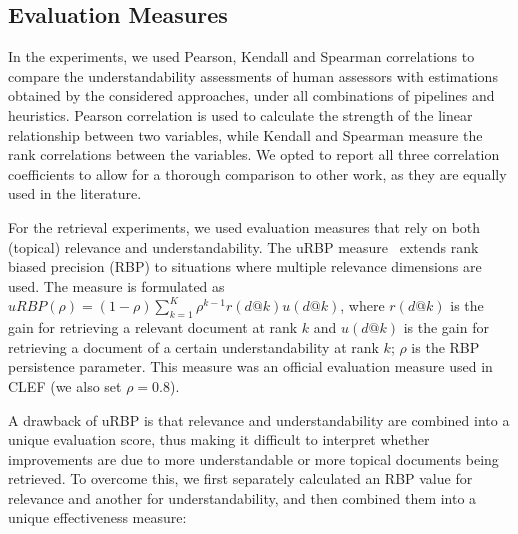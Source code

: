 \subsection{Evaluation Measures}

In the experiments, we used Pearson, Kendall and Spearman correlations to compare the understandability assessments of human assessors with estimations obtained by the considered approaches, under all combinations of pipelines and heuristics. Pearson correlation is used to calculate the strength of the linear relationship between two variables, while Kendall and Spearman measure the rank correlations between the variables. We opted to report all three correlation coefficients to allow for a thorough comparison to other work, as they are equally used in the literature. 

For the retrieval experiments, we used evaluation measures that rely on both (topical) relevance and understandability. 
The uRBP measure~\cite{zuccon2016understandability} extends rank biased precision (RBP) to situations where multiple relevance dimensions are used. The measure is formulated as $uRBP(\rho) = (1 - \rho) \sum_{k=1}^{K} \rho^{k-1} r(d@k) u(d@k)$, where $r(d@k)$ is the gain for retrieving a relevant document at rank $k$ and $u(d@k)$ is the gain for retrieving a document of a certain understandability at rank $k$; $\rho$ is the RBP persistence parameter. This measure was an official evaluation measure used in CLEF (we also set $\rho=0.8$). 

A drawback of uRBP is that relevance and understandability are combined into a unique evaluation score, thus making it difficult to interpret whether improvements are due to more understandable or more topical documents being retrieved. To overcome this, we first separately calculated an RBP value for relevance and another for understandability, and then combined them into a unique effectiveness measure:

